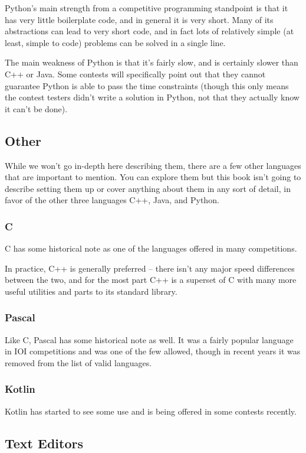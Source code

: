 Python's main strength from a competitive programming standpoint is that it has very little boilerplate code, and in general it is very short. Many of its abstractions can lead to very short code, and in fact lots of relatively simple (at least, simple to code) problems can be solved in a single line.

The main weakness of Python is that it's fairly slow, and is certainly slower than C++ or Java. Some contests will specifically point out that they cannot guarantee Python is able to pass the time constraints (though this only means the contest testers didn't write a solution in Python, not that they actually know it can't be done).

\subsection{Other}

While we won't go in-depth here describing them, there are a few other languages that are important to mention. You can explore them but this book isn't going to describe setting them up or cover anything about them in any sort of detail, in favor of the other three languages C++, Java, and Python.

\subsubsection{C}

C has some historical note as one of the languages offered in many competitions.

In practice, C++ is generally preferred -- there isn't any major speed differences between the two, and for the most part C++ is a superset of C with many more useful utilities and parts to its standard library.

\subsubsection{Pascal}

Like C, Pascal has some historical note as well. It was a fairly popular language in IOI competitions and was one of the few allowed, though in recent years it was removed from the list of valid languages.

\subsubsection{Kotlin}

Kotlin has started to see some use and is being offered in some contests recently.

\subsection{Text Editors}